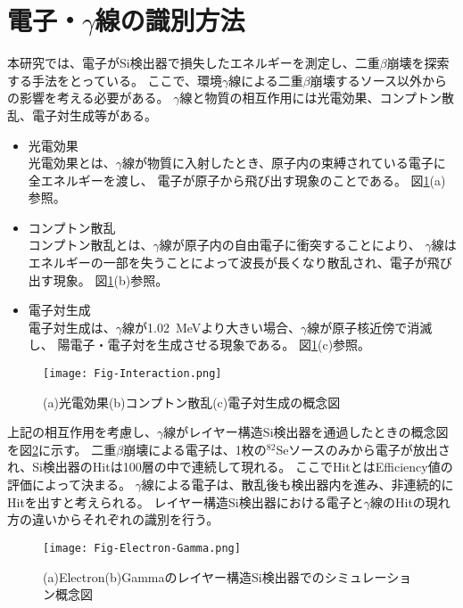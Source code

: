 \documentclass[a4paper,10pt]{jreport}
\begin{document}
\section{電子・$\gamma$線の識別方法}

本研究では、電子がSi検出器で損失したエネルギーを測定し、二重$\beta$崩壊を探索する手法をとっている。
ここで、環境$\gamma$線による二重$\beta$崩壊するソース以外からの影響を考える必要がある。
$\gamma$線と物質の相互作用には光電効果、コンプトン散乱、電子対生成等がある。

\begin{itemize}
	\item 光電効果 \\
	光電効果とは、$\gamma$線が物質に入射したとき、原子内の束縛されている電子に全エネルギーを渡し、
	電子が原子から飛び出す現象のことである。
	図\ref{Fig-Interaction}(a)参照。
	
	\item コンプトン散乱 \\
	コンプトン散乱とは、$\gamma$線が原子内の自由電子に衝突することにより、
	$\gamma$線はエネルギーの一部を失うことによって波長が長くなり散乱され、電子が飛び出す現象。
	図\ref{Fig-Interaction}(b)参照。
	
	\item 電子対生成 \\
	電子対生成は、$\gamma$線が\SI{1.02}{MeV}より大きい場合、$\gamma$線が原子核近傍で消滅し、
	陽電子・電子対を生成させる現象である。
	図\ref{Fig-Interaction}(c)参照。
\end{itemize}

\begin{figure}[H]
	\center
	\texttt{[image: Fig-Interaction.png]}
	\caption{(a)光電効果(b)コンプトン散乱(c)電子対生成の概念図} \label{Fig-Interaction}
\end{figure}

上記の相互作用を考慮し、$\gamma$線がレイヤー構造Si検出器を通過したときの概念図を図\ref{Fig-Electron-Gamma}に示す。
二重$\beta$崩壊による電子は、1枚の$^{82}$Seソースのみから電子が放出され、Si検出器のHitは100層の中で連続して現れる。
ここでHitとはEfficiency値の評価によって決まる。
$\gamma$線による電子は、散乱後も検出器内を進み、非連続的にHitを出すと考えられる。
レイヤー構造Si検出器における電子と$\gamma$線のHitの現れ方の違いからそれぞれの識別を行う。

\begin{figure}[H]
	\center
	\texttt{[image: Fig-Electron-Gamma.png]}
	\caption{(a)Electron(b)Gammaのレイヤー構造Si検出器でのシミュレーション概念図} \label{Fig-Electron-Gamma}
\end{figure}
\end{document}

